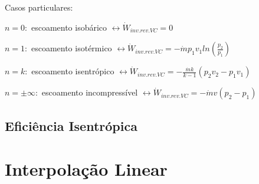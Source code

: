 \documentclass[a4paper, 12pt]{article}
\begin{document}
Casos particulares:
	\begin{center}
		$ n = 0: $ escoamento isobárico $ \leftrightarrow  \dot{W}_{inv.rev.VC} = 0 $ 
		
		$ n = 1: $ escoamento isotérmico $ \leftrightarrow  \dot{W}_{inv.rev.VC} = -\dot{m}p_1v_1ln(\frac{p_2}{p_1}) $ 
		
		$ n = k: $ escoamento isentrópico $ \leftrightarrow  \dot{W}_{inv.rev.VC} = -\frac{\dot{m}k}{k-1}(p_2v_2-p_1v_1) $ 
		
		$ n = \pm\infty: $ escoamento incompressível $ \leftrightarrow  \dot{W}_{inv.rev.VC} = -\dot{m}v(p_2-p_1) $ 
	\end{center}

\subsection{Eficiência Isentrópica}








\newpage
\section{Interpolação Linear}
\end{document}
